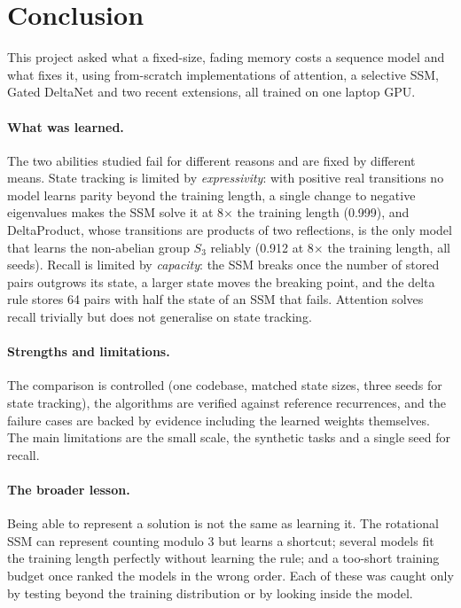 \section{Conclusion}
\label{sec:conclusion}

This project asked what a fixed-size, fading memory costs a sequence model and what fixes it, using
from-scratch implementations of attention, a selective SSM, Gated DeltaNet and two recent extensions, all trained
on one laptop GPU.

\paragraph{What was learned.} The two abilities studied fail for different reasons and are fixed by different
means. State tracking is limited by \emph{expressivity}: with positive real transitions no model learns parity
beyond the training length, a single change to negative eigenvalues makes the SSM solve it at 8$\times$ the
training length (0.999), and DeltaProduct, whose transitions are products of two reflections, is the only model
that learns the non-abelian group $S_3$ reliably (0.912 at 8$\times$ the training length, all seeds). Recall is
limited by \emph{capacity}: the SSM breaks once the number of stored pairs outgrows its state, a larger state moves
the breaking point, and the delta rule stores 64 pairs with half the state of an SSM that fails. Attention solves
recall trivially but does not generalise on state tracking.

\paragraph{Strengths and limitations.} The comparison is controlled (one codebase, matched state sizes, three
seeds for state tracking), the algorithms are verified against reference recurrences, and the failure cases are
backed by evidence including the learned weights themselves. The main limitations are the small scale, the
synthetic tasks and a single seed for recall.

\paragraph{The broader lesson.} Being able to represent a solution is not the same as learning it. The
rotational SSM can represent counting modulo 3 but learns a shortcut; several models fit the training length
perfectly without learning the rule; and a too-short training budget once ranked the models in the wrong order.
Each of these was caught only by testing beyond the training distribution or by looking inside the model.


